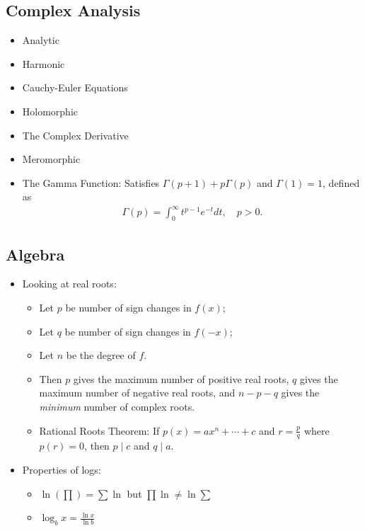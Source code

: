\hypertarget{complex-analysis-1}{%
\subsection{Complex Analysis}\label{complex-analysis-1}}

\begin{itemize}
\tightlist
\item
  Analytic
\item
  Harmonic
\item
  Cauchy-Euler Equations
\item
  Holomorphic
\item
  The Complex Derivative
\item
  Meromorphic
\item
  The Gamma Function: Satisfies \(\Gamma(p+1) + p\Gamma(p)\) and
  \(\Gamma(1) = 1\), defined as
  \begin{align*}  
  \Gamma ( p ) = \int _ { 0 } ^ { \infty } t ^ { p - 1 } e ^ { - t } d t , \quad p > 0
  .\end{align*}
\end{itemize}

\hypertarget{algebra-2}{%
\subsection{Algebra}\label{algebra-2}}

\begin{itemize}
\item
  Looking at real roots:

  \begin{itemize}
  \tightlist
  \item
    Let \(p\) be number of sign changes in \(f(x)\);
  \item
    Let \(q\) be number of sign changes in \(f(-x)\);
  \item
    Let \(n\) be the degree of \(f\).
  \item
    Then \(p\) gives the maximum number of positive real roots, \(q\)
    gives the maximum number of negative real roots, and \(n-p-q\) gives
    the \emph{minimum} number of complex roots.
  \item
    Rational Roots Theorem: If \(p(x) = ax^n +\cdots + c\) and
    \(r = \frac{p}{q}\) where \(p(r) = 0\), then \(p \mid c\) and
    \(q \mid a\).
  \end{itemize}
\item
  Properties of logs:

  \begin{itemize}
  \tightlist
  \item
    \(\ln(\prod) = \sum \ln\) but \(\prod \ln \neq \ln \sum\)
  \item
    \(\log_b x = \frac{\ln x}{\ln b}\)
  \end{itemize}
\end{itemize}

